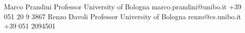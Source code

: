 %
%
%


\begin{referees}
		{Marco Prandini}
		{Professor}
		{University of Bologna}
		{marco.prandini@unibo.it}
		{+39 051 20 9 3867}
		{Renzo Davoli}
		{Professor}
		{University of Bologna}
		{renzo@cs.unibo.it}
		{+39 051 2094501}

\end{referees}
